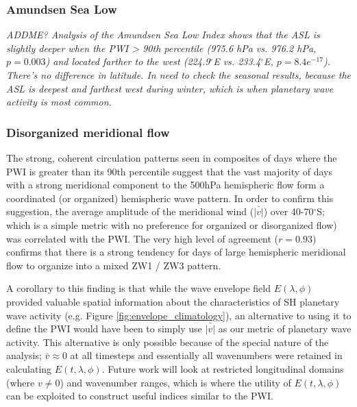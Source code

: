 \subsubsection{Amundsen Sea Low}

\textit{ADDME? Analysis of the Amundsen Sea Low Index \citep{Turner2013} shows that the ASL is slightly deeper when the PWI > 90th percentile (975.6 hPa vs. 976.2 hPa, $p = 0.003$) and located farther to the west (224.9$^{\circ}$E vs. 233.4$^{\circ}$E, $p = 8.4e^{-17}$). There's no difference in latitude.  In need to check the seasonal results, because the ASL is deepest and farthest west during winter, which is when planetary wave activity is most common.}  

\subsubsection{Disorganized meridional flow}

The strong, coherent circulation patterns seen in composites of days where the PWI is greater than its 90th percentile suggest that the vast majority of days with a strong meridional component to the 500hPa hemispheric flow form a coordinated (or organized) hemispheric wave pattern. In order to confirm this suggestion, the average amplitude of the meridional wind ($\bar{\lvert v \rvert}$) over 40-70$^{\circ}$S; which is a simple metric with no preference for organized or disorganized flow) was correlated with the PWI. The very high level of agreement ($r = 0.93$) confirms that there is a strong tendency for days of large hemispheric meridional flow to organize into a mixed ZW1 / ZW3 pattern. 

A corollary to this finding is that while the wave envelope field $E(\lambda,\phi)$ provided valuable spatial information about the characteristics of SH planetary wave activity (e.g. Figure \ref{fig:envelope_climatology}), an alternative to using it to define the PWI would have been to simply use $\bar{\lvert v \rvert}$ as our metric of planetary wave activity. This alternative is only possible because of the special nature of the analysis; $\bar{v} \approx 0$ at all timesteps and essentially all wavenumbers were retained in calculating $E(t,\lambda,\phi)$. Future work will look at restricted longitudinal domains (where $v \neq 0$) and wavenumber ranges, which is where the utility of $E(t,\lambda,\phi)$ can be exploited to construct useful indices similar to the PWI. 
